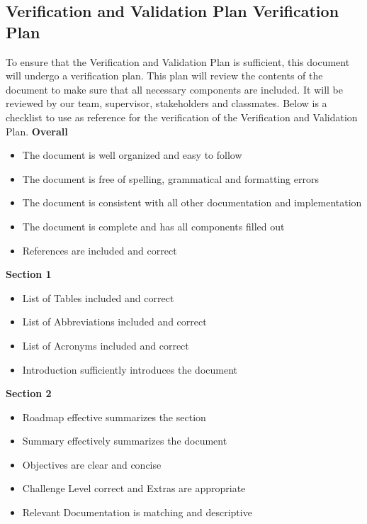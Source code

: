 \documentclass[12pt, titlepage]{article}
\begin{document}
\subsection{Verification and Validation Plan Verification Plan}




To ensure that the Verification and Validation Plan is sufficient, this document will undergo a verification plan.
This plan will review the contents of the document to make sure that all necessary components are included.
It will be reviewed by our team, supervisor, stakeholders and classmates.
Below is a checklist to use as reference for the verification of the Verification and Validation Plan.
\bigskip
\newline
\textbf{Overall}
\begin{itemize}
  \item The document is well organized and easy to follow
  \item The document is free of spelling, grammatical and formatting errors
  \item The document is consistent with all other documentation and implementation
  \item The document is complete and has all components filled out
  \item References are included and correct
\end{itemize}
\noindent
\textbf{Section 1}
\begin{itemize}
  \item List of Tables included and correct
  \item List of Abbreviations included and correct
  \item List of Acronyms included and correct
  \item Introduction sufficiently introduces the document
\end{itemize}
\noindent
\textbf{Section 2}
\begin{itemize}
  \item Roadmap effective summarizes the section
  \item Summary effectively summarizes the document
  \item Objectives are clear and concise
  \item Challenge Level correct and Extras are appropriate
  \item Relevant Documentation is matching and descriptive
\end{itemize}
\end{document}
